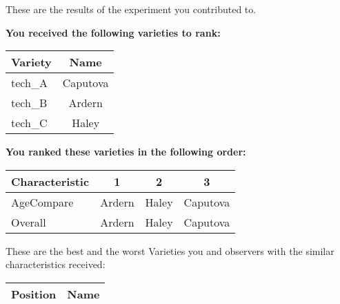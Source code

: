 \documentclass[10pt]{article}
\begin{document}
\begin{titlepage}
	These are the results of the experiment you contributed to.

	\begin{flushleft}
		\textbf{You received the following varieties to rank: }\hfill \break
		\begin{tabularx}{\textwidth}{ X | c  }
			\hline
			\textbf{Variety} & \textbf{Name} \\ \hline

			
				tech\_A & Caputova \\ \hline
			
				tech\_B & Ardern \\ \hline
			
				tech\_C & Haley \\ \hline
			


		\end{tabularx}\newline \newline

		\textbf{You ranked these varieties in the following order: }\hfill \break
		\begin{tabularx}{\textwidth}{ X | c | c | c  }
			\hline
			\textbf{Characteristic}
			
				& \textbf{ 1 }
			
				& \textbf{ 2 }
			
				& \textbf{ 3 }
			
			\\ \hline


			
				AgeCompare & Ardern  & Haley  & Caputova  \\ \hline


			
				Overall & Ardern  & Haley  & Caputova  \\ \hline


			

		\end{tabularx}

	\end{flushleft}

	\pagebreak

	\begin{flushleft}
		These are the best and the worst Varieties you and observers with the similar characteristics received:\hfill \break \newline
		\begin{tabularx}{\textwidth}{ X | X  }
			\hline
			\textbf{Position} & \textbf{Name} \\ \hline


\end{tabularx}
\end{flushleft}
\end{titlepage}
\end{document}
